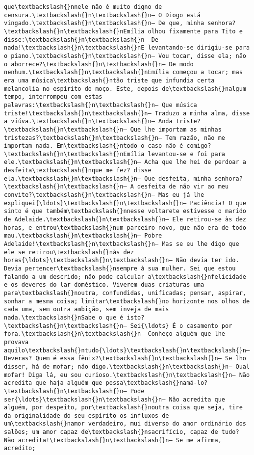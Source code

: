\documentclass[11pt]{article}
\begin{document}
\begin{Verbatim}[commandchars=\\\{\}]
que\textbackslash{}nnele não é muito digno de censura.\textbackslash{}n\textbackslash{}n— O Diogo está vingado.\textbackslash{}n\textbackslash{}n— De que, minha senhora?\textbackslash{}n\textbackslash{}nEmília olhou fixamente para Tito e disse:\textbackslash{}n\textbackslash{}n— De nada!\textbackslash{}n\textbackslash{}nE levantando-se dirigiu-se para o piano.\textbackslash{}n\textbackslash{}n— Vou tocar, disse ela; não o aborrece?\textbackslash{}n\textbackslash{}n— De modo nenhum.\textbackslash{}n\textbackslash{}nEmília começou a tocar; mas era uma música\textbackslash{}ntão triste que infundia certa melancolia no espírito do moço. Este, depois de\textbackslash{}nalgum tempo, interrompeu com estas palavras:\textbackslash{}n\textbackslash{}n— Que música triste!\textbackslash{}n\textbackslash{}n— Traduzo a minha alma, disse a viúva.\textbackslash{}n\textbackslash{}n— Anda triste?\textbackslash{}n\textbackslash{}n— Que lhe importam as minhas tristezas?\textbackslash{}n\textbackslash{}n— Tem razão, não me importam nada. Em\textbackslash{}ntodo o caso não é comigo?\textbackslash{}n\textbackslash{}nEmília levantou-se e foi para ele.\textbackslash{}n\textbackslash{}n— Acha que lhe hei de perdoar a desfeita\textbackslash{}nque me fez? disse ela.\textbackslash{}n\textbackslash{}n— Que desfeita, minha senhora?\textbackslash{}n\textbackslash{}n— A desfeita de não vir ao meu convite?\textbackslash{}n\textbackslash{}n— Mas eu já lhe expliquei{\ldots}\textbackslash{}n\textbackslash{}n— Paciência! O que sinto é que também\textbackslash{}nnesse voltarete estivesse o marido de Adelaide.\textbackslash{}n\textbackslash{}n— Ele retirou-se às dez horas, e entrou\textbackslash{}num parceiro novo, que não era de todo mau.\textbackslash{}n\textbackslash{}n— Pobre Adelaide!\textbackslash{}n\textbackslash{}n— Mas se eu lhe digo que ele se retirou\textbackslash{}nàs dez horas{\ldots}\textbackslash{}n\textbackslash{}n— Não devia ter ido. Devia pertencer\textbackslash{}nsempre à sua mulher. Sei que estou falando a um descrido; não pode calcular a\textbackslash{}nfelicidade e os deveres do lar doméstico. Viverem duas criaturas uma para\textbackslash{}noutra, confundidas, unificadas; pensar, aspirar, sonhar a mesma coisa; limitar\textbackslash{}no horizonte nos olhos de cada uma, sem outra ambição, sem inveja de mais nada.\textbackslash{}nSabe o que é isto?\textbackslash{}n\textbackslash{}n— Sei{\ldots} É o casamento por fora.\textbackslash{}n\textbackslash{}n— Conheço alguém que lhe provava aquilo\textbackslash{}ntudo{\ldots}\textbackslash{}n\textbackslash{}n— Deveras? Quem é essa fênix?\textbackslash{}n\textbackslash{}n— Se lho disser, há de mofar; não digo.\textbackslash{}n\textbackslash{}n— Qual mofar! Diga lá, eu sou curioso.\textbackslash{}n\textbackslash{}n— Não acredita que haja alguém que possa\textbackslash{}namá-lo?\textbackslash{}n\textbackslash{}n— Pode ser{\ldots}\textbackslash{}n\textbackslash{}n— Não acredita que alguém, por despeito, por\textbackslash{}noutra coisa que seja, tire da originalidade do seu espírito os influxos de um\textbackslash{}namor verdadeiro, mui diverso do amor ordinário dos salões; um amor capaz de\textbackslash{}nsacrifício, capaz de tudo? Não acredita!\textbackslash{}n\textbackslash{}n— Se me afirma, acredito; 
\end{Verbatim}
\end{document}
